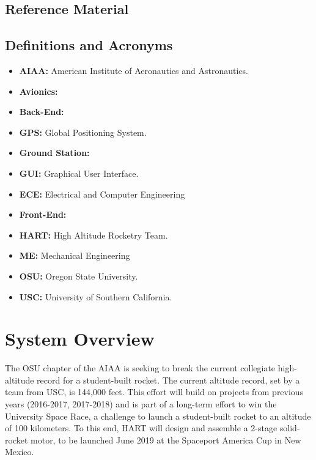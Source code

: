 \documentclass[journal,10pt,onecolumn,compsoc]{IEEEtran}
\begin{document}
\subsection{Reference Material}

\subsection{Definitions and Acronyms}
\begin{itemize}
	\item \textbf{AIAA:}
		American Institute of Aeronautics and Astronautics.
	\item \textbf{Avionics:}
	
	\item \textbf{Back-End:}
	
	\item \textbf{GPS:}
		Global Positioning System.
	\item \textbf{Ground Station:}
	
	\item \textbf{GUI:}
		Graphical User Interface.
	
	\item \textbf{ECE:}
		Electrical and Computer Engineering
	\item \textbf{Front-End:}
	
	\item \textbf{HART:}
		High Altitude Rocketry Team.
	\item \textbf{ME:}
		Mechanical Engineering	
	\item \textbf{OSU:}
		Oregon State University.
	\item \textbf{USC:}
		University of Southern California.
\end{itemize}
\newpage


\section{System Overview}
	\noindent The OSU chapter of the AIAA is seeking to break the current collegiate high-altitude record for a student-built rocket.
	The current altitude record, set by a team from USC, is 144,000 feet.
	This effort will build on projects from previous years (2016-2017, 2017-2018) and is part of a long-term effort to win the University Space Race, a challenge to launch a student-built rocket to an altitude of 100 kilometers.
	To this end, HART will design and assemble a 2-stage solid-rocket motor, to be launched June 2019 at the Spaceport America Cup in New Mexico. 
\end{document}
